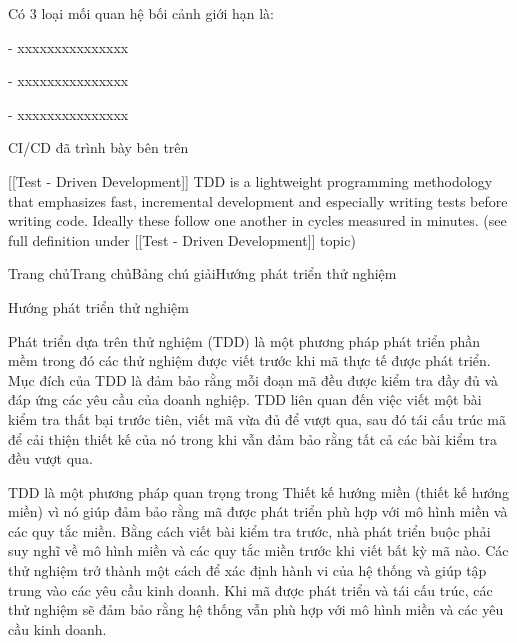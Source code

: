 Có 3 loại mối quan hệ bối cảnh giới hạn là:

- xxxxxxxxxxxxxxx

- xxxxxxxxxxxxxxx

- xxxxxxxxxxxxxxx



CI/CD đã trình bày bên trên







[[Test - Driven Development]] TDD is a lightweight programming methodology that emphasizes fast, incremental development and especially writing tests before writing code. Ideally these follow one another in cycles measured in minutes. (see full definition under [[Test - Driven Development]] topic)

Trang chủTrang chủBảng chú giảiHướng phát triển thử nghiệm

Hướng phát triển thử nghiệm

Phát triển dựa trên thử nghiệm (TDD) là một phương pháp phát triển phần mềm trong đó các thử nghiệm được viết trước khi mã thực tế được phát triển. Mục đích của TDD là đảm bảo rằng mỗi đoạn mã đều được kiểm tra đầy đủ và đáp ứng các yêu cầu của doanh nghiệp. TDD liên quan đến việc viết một bài kiểm tra thất bại trước tiên, viết mã vừa đủ để vượt qua, sau đó tái cấu trúc mã để cải thiện thiết kế của nó trong khi vẫn đảm bảo rằng tất cả các bài kiểm tra đều vượt qua.

TDD là một phương pháp quan trọng trong Thiết kế hướng miền (thiết kế hướng miền) vì nó giúp đảm bảo rằng mã được phát triển phù hợp với mô hình miền và các quy tắc miền. Bằng cách viết bài kiểm tra trước, nhà phát triển buộc phải suy nghĩ về mô hình miền và các quy tắc miền trước khi viết bất kỳ mã nào. Các thử nghiệm trở thành một cách để xác định hành vi của hệ thống và giúp tập trung vào các yêu cầu kinh doanh. Khi mã được phát triển và tái cấu trúc, các thử nghiệm sẽ đảm bảo rằng hệ thống vẫn phù hợp với mô hình miền và các yêu cầu kinh doanh.

